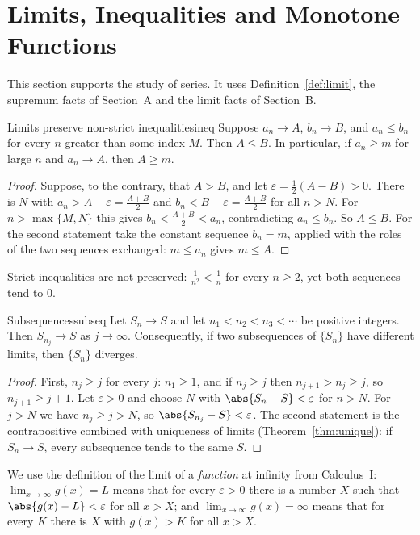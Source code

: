 \documentclass[11pt]{article}
\begin{document}
\section{Limits, Inequalities and Monotone Functions}

This section supports the study of series. It uses Definition~\ref{def:limit}, the supremum facts of Section~A and the limit facts of Section~B.

\begin{thm}{Limits preserve non-strict inequalities}{ineq}
Suppose $a_n\to A$, $b_n\to B$, and $a_n\le b_n$ for every $n$ greater than some index $M$. Then $A\le B$. In particular, if $a_n\ge m$ for large $n$ and $a_n\to A$, then $A\ge m$.
\end{thm}
\begin{proof}
Suppose, to the contrary, that $A>B$, and let $\varepsilon=\frac12(A-B)>0$. There is $N$ with $a_n>A-\varepsilon=\frac{A+B}2$ and $b_n<B+\varepsilon=\frac{A+B}2$ for all $n>N$. For $n>\max\{M,N\}$ this gives $b_n<\frac{A+B}2<a_n$, contradicting $a_n\le b_n$. So $A\le B$. For the second statement take the constant sequence $b_n=m$, applied with the roles of the two sequences exchanged: $m\le a_n$ gives $m\le A$.
\end{proof}

Strict inequalities are not preserved: $\frac1{n^2}<\frac1n$ for every $n\ge2$, yet both sequences tend to $0$.

\begin{thm}{Subsequences}{subseq}
Let $S_n\to S$ and let $n_1<n_2<n_3<\cdots$ be positive integers. Then $S_{n_j}\to S$ as $j\to\infty$. Consequently, if two subsequences of $\{S_n\}$ have different limits, then $\{S_n\}$ diverges.
\end{thm}
\begin{proof}
First, $n_j\ge j$ for every $j$: $n_1\ge1$, and if $n_j\ge j$ then $n_{j+1}>n_j\ge j$, so $n_{j+1}\ge j+1$. Let $\varepsilon>0$ and choose $N$ with $\abs{S_n-S}<\varepsilon$ for $n>N$. For $j>N$ we have $n_j\ge j>N$, so $\abs{S_{n_j}-S}<\varepsilon$. The second statement is the contrapositive combined with uniqueness of limits (Theorem~\ref{thm:unique}): if $S_n\to S$, every subsequence tends to the same $S$.
\end{proof}

We use the definition of the limit of a \emph{function} at infinity from Calculus~I: $\lim_{x\to\infty}g(x)=L$ means that for every $\varepsilon>0$ there is a number $X$ such that $\abs{g(x)-L}<\varepsilon$ for all $x>X$; and $\lim_{x\to\infty}g(x)=\infty$ means that for every $K$ there is $X$ with $g(x)>K$ for all $x>X$.
\end{document}
